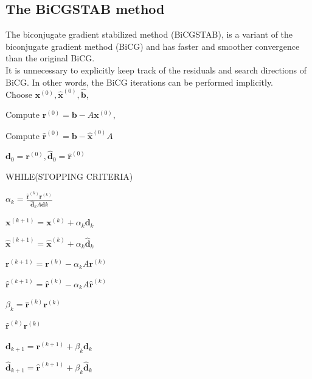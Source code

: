 \documentclass[11pt]{book}
\begin{document}
\subsection*{The BiCGSTAB method}
The biconjugate gradient stabilized method (BiCGSTAB), is a variant of the biconjugate gradient method (BiCG) and has faster and smoother convergence than the original BiCG.\\
It is unnecessary to explicitly keep track of the residuals and search directions of BiCG. In other words, the BiCG iterations can be performed implicitly. \\

Choose $\mathbf{x}^{(0)}, \hat{\mathbf{x}}^{(0)}, \hat{\mathbf{b}}$,

Compute $\mathbf{r}^{(0)}=\mathbf{b}-A \mathbf{x}^{(0)}$,

Compute $\hat{\mathbf{r}}^{(0)}=\mathbf{b}-\hat{\mathbf{x}}^{(0)} A$

$\mathbf{d}_{0}=\mathbf{r}^{(0)}, \hat{\mathbf{d}}_{0}=\hat{\mathbf{r}}^{(0)}$

WHILE(STOPPING CRITERIA)

$\alpha_{k}=\frac{\hat{\mathbf{r}}^{(k)} \mathbf{r}^{(k)}}{\hat{\mathbf{d}}_{k} A \mathbf{d} k}$

$\mathbf{x}^{(k+1)}=\mathbf{x}^{(k)}+\alpha_{k} \mathbf{d}_{k}$

$\hat{\mathbf{x}}^{(k+1)}=\hat{\mathbf{x}}^{(k)}+\alpha_{k} \hat{\mathbf{d}}_{k}$

$\mathbf{r}^{(k+1)}=\mathbf{r}^{(k)}-\alpha_{k} A \mathbf{r}^{(k)} $

$\hat{\mathbf{r}}^{(k+1)}=\hat{\mathbf{r}}^{(k)}-\alpha_{k} A \hat{\mathbf{r}}^{(k)}$ 

$ \beta_{k}= \hat{\mathbf{r}}^{(k)} \mathbf{r}^{(k)} $

$ \hat{\mathbf{r}}^{(k)} \mathbf{r}^{(k)} $

$ \mathbf{d}_{k+1}=\mathbf{r}^{(k+1)}+\beta_{k} \mathbf{d}_{k} $

$ \hat{\mathbf{d}}_{k+1}=\hat{\mathbf{r}}^{(k+1)}+\beta_{k} \hat{\mathbf{d}}_{k} $
\end{document}

